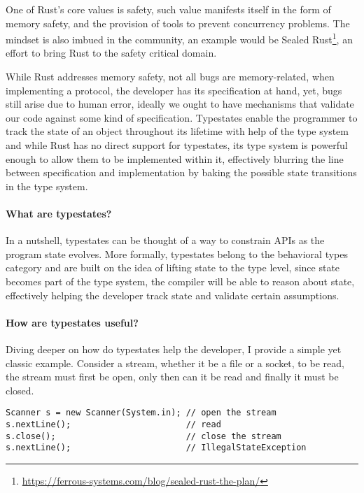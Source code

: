 \documentclass{article}
\begin{document}

One of Rust's core values is safety,
such value manifests itself in the form of memory safety,
and the provision of tools to prevent concurrency problems.
The mindset is also imbued in the community,
an example would be Sealed Rust\footnote{\url{https://ferrous-systems.com/blog/sealed-rust-the-plan/}},
an effort to bring Rust to the safety critical domain.

While Rust addresses memory safety, not all bugs are memory-related,
when implementing a protocol, the developer has its specification at hand, yet, bugs still arise due to human error,
ideally we ought to have mechanisms that validate our code against some kind of specification.
Typestates enable the programmer to track the state of an object throughout its lifetime with help of the type system
and while Rust has no direct support for typestates,
its type system is powerful enough to allow them to be implemented within it,
effectively blurring the line between specification and implementation by baking the possible state transitions in the type system.

\paragraph{What are typestates?}

In a nutshell, typestates can be thought of a way to constrain APIs as the program state evolves.
More formally, typestates belong to the behavioral types category and are built on the idea of lifting state to the type level,
since state becomes part of the type system, the compiler will be able to reason about state,
effectively helping the developer track state and validate certain assumptions.

\paragraph{How are typestates useful?}

Diving deeper on how do typestates help the developer, I provide a simple yet classic example.
Consider a stream, whether it be a file or a socket, to be read, the stream must first be open,
only then can it be read and finally it must be closed.

\begin{verbatim}
Scanner s = new Scanner(System.in); // open the stream
s.nextLine();                       // read
s.close();                          // close the stream
s.nextLine();                       // IllegalStateException
\end{verbatim}
\end{document}

